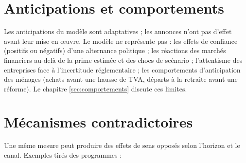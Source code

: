 \documentclass[
  11pt,
  11pt,
  a4paper,
  openany]{book}
\begin{document}
\hypertarget{sec:anticipations-transmission}{%
\section{Anticipations et
comportements}\label{sec:anticipations-transmission}}

Les anticipations du modèle sont adaptatives ; les annonces n'ont pas
d'effet avant leur mise en œuvre. Le modèle ne représente pas : les
effets de confiance (positifs ou négatifs) d'une alternance politique ;
les réactions des marchés financiers au-delà de la prime estimée et des
chocs de scénario ; l'attentisme des entreprises face à l'incertitude
réglementaire ; les comportements d'anticipation des ménages (achats
avant une hausse de TVA, départs à la retraite avant une réforme). Le
chapitre \ref{sec:comportements} discute ces limites.

\hypertarget{sec:contradictoires}{%
\section{Mécanismes contradictoires}\label{sec:contradictoires}}

Une même mesure peut produire des effets de sens opposés selon l'horizon
et le canal. Exemples tirés des programmes :
\end{document}
